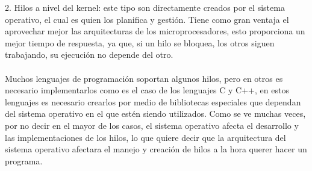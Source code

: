 \documentclass{article}
\begin{document}
2. Hilos a nivel del kernel: este tipo son directamente creados por el sistema operativo, el cual es quien los planifica y gestión. Tiene como gran ventaja el aprovechar mejor las arquitecturas de los microprocesadores, esto proporciona un mejor tiempo de respuesta, ya que, si un hilo se bloquea, los otros siguen trabajando,  su ejecución no depende del otro. \citep{3}\\\\
Muchos lenguajes de programación soportan algunos hilos, pero en otros es necesario implementarlos como es el caso de los lenguajes C y C++, en estos lenguajes es necesario crearlos por medio de bibliotecas especiales que dependan del sistema operativo en el que estén siendo utilizados. Como se ve muchas veces, por no decir en el mayor de los casos, el sistema operativo afecta el desarrollo y las implementaciones de los hilos, lo que quiere decir que la arquitectura del sistema operativo afectara el manejo y creación de hilos a la hora querer hacer un programa.\citep{4}



\end{document}
